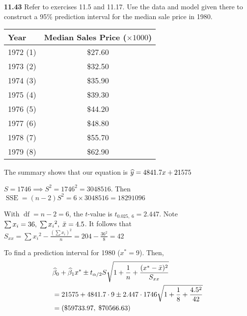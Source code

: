 \textbf{11.43} Refer to exercises 11.5 and 11.17. Use the data and model given there to construct a 95\% prediction interval for the median sale price in 1980.

\begin{center}
    \begin{tabular}{lc}
         \hline
         Year & Median Sales Price ($\times 1000$)\\
         \hline
         1972 (1) & \$27.60 \\
         1973 (2) & \$32.50 \\
         1974 (3) & \$35.90 \\
         1975 (4) & \$39.30 \\
         1976 (5) & \$44.20 \\
         1977 (6) & \$48.80 \\
         1978 (7) & \$55.70 \\
         1979 (8) & \$62.90 \\
         \hline
    \end{tabular}
\end{center}

\nl The summary shows that our equation is $\widehat{y} = 4841.7x + 21575$

\nl $S=1746 \implies S^2 = 1746^2 = 3048516$. Then $\operatorname{SSE} = (n-2)S^2 = 6 \times 3048516 = 18291096$

\soln* With $\operatorname{df} = n - 2 = 6$, the $t$-value is $t_{0.025,\;6} = 2.447$. Note $\sum x_i = 36, \; \sum {x_i}^2, \; \bar{x} = 4.5$.
It follows that $\displaystyle S_{xx} = \sum {x_i}^2 - \frac{(\sum x_i)^2}{n} = 204 - \frac{36^2}{8} = 42 $

\nl To find a prediction interval for 1980 ($x^{\ast} = 9$). Then,
\begin{align*}
    & \bat_0 + \bat_1 \xstar \pm t_{\alpha / 2} S \sqrt{1 + \over n + \frac{(\xstar - \xbar)^2}{S_{xx}} }\\
&= 21575 + 4841.7 \cdot 9 \pm 2.447 \cdot 1746 \sqrt{1 + \over 8 + \frac{4.5^2}{42}}\\
&= (\$ 59733.97, \; \$ 70566.63) 
\end{align*}